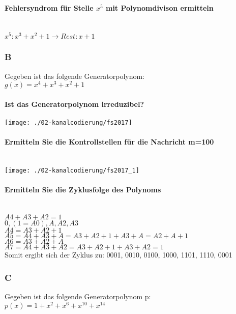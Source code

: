 \paragraph{Fehlersyndrom für Stelle $x^5$ mit Polynomdivison ermitteln}\mbox{}\\
$x^5:x^3+x^2+1 \rightarrow Rest: x+1$

\subsubsection{B}
Gegeben ist das folgende Generatorpolynom:\\
$g(x)=x^4+x^3+x^2+1$

\paragraph{Ist das Generatorpolynom irreduzibel?}
    \vspace{-8pt}
    \texttt{[image: ./02-kanalcodierung/fs2017]}
    \vspace{-8pt}

\paragraph{Ermitteln Sie die Kontrollstellen für die Nachricht m=100}\mbox{}\\
    \vspace{-8pt}
    \texttt{[image: ./02-kanalcodierung/fs2017\_1]}
    \vspace{-8pt}

\paragraph{Ermitteln Sie die Zyklusfolge des Polynoms}\mbox{}\\
$A4+A3+A2=1$\\
$0,(1=A0),A,A2,A3$\\

$A4=A3+A2+1$\\

$A5 = A4 + A3 + A = A3 + A2 + 1 +  A3 + A =  A2 + A + 1$\\
$A6= A3 + A2 + A$\\
$A7= A4 + A3 + A2 = A3 + A2 + 1 + A3 + A2 = 1$\\
Somit ergibt sich der Zyklus zu: 0001, 0010, 0100, 1000, 1101, 1110, 0001

\columnbreak

\subsubsection{C}
Gegeben ist das folgende Generatorpolynom p:\\
$p(x)=1+x^2+x^6+x^{10}+x^{14}$\\

